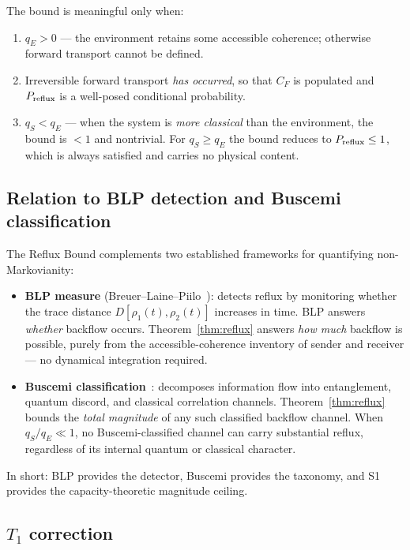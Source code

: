 \documentclass[aps,prd,twocolumn,superscriptaddress,nofootinbib,floatfix]{revtex4-2}
\begin{document}
The bound is meaningful only when:
\begin{enumerate}
  \item $q_E > 0$ --- the environment retains some accessible coherence;
    otherwise forward transport cannot be defined.
  \item Irreversible forward transport \emph{has occurred}, so that $C_F$ is
    populated and $P_{\rm reflux}$ is a well-posed conditional probability.
  \item $q_S < q_E$ --- when the system is \emph{more classical} than the
    environment, the bound is $<1$ and nontrivial.  For $q_S \ge q_E$ the
    bound reduces to $P_{\rm reflux}\le 1$, which is always satisfied and
    carries no physical content.
\end{enumerate}

\subsection{Relation to BLP detection and Buscemi classification}

The Reflux Bound complements two established frameworks for quantifying
non-Markovianity:

\begin{itemize}
  \item \textbf{BLP measure} (Breuer--Laine--Piilo~\cite{blp2009}):
    detects reflux by monitoring whether the trace distance
    $D[\rho_1(t),\rho_2(t)]$ increases in time.  BLP answers
    \emph{whether} backflow occurs.  Theorem~\ref{thm:reflux} answers
    \emph{how much} backflow is possible, purely from the accessible-coherence
    inventory of sender and receiver --- no dynamical integration required.
  \item \textbf{Buscemi classification}~\cite{buscemi2014}:
    decomposes information flow into entanglement, quantum discord, and
    classical correlation channels.  Theorem~\ref{thm:reflux} bounds the
    \emph{total magnitude} of any such classified backflow channel.  When
    $q_S/q_E \ll 1$, no Buscemi-classified channel can carry substantial
    reflux, regardless of its internal quantum or classical character.
\end{itemize}

In short: BLP provides the detector, Buscemi provides the taxonomy, and
S1 provides the capacity-theoretic magnitude ceiling.

\subsection{$T_1$ correction}
\end{document}
